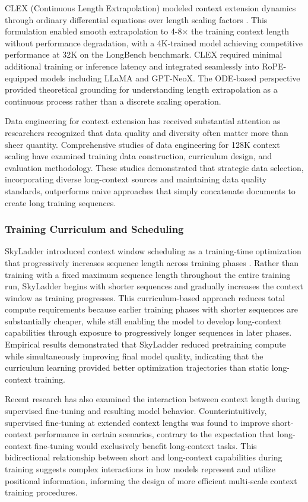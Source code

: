 CLEX (Continuous Length Extrapolation) modeled context extension dynamics through ordinary differential equations over length scaling factors \citep{chen2024clex}. This formulation enabled smooth extrapolation to 4-8$\times$ the training context length without performance degradation, with a 4K-trained model achieving competitive performance at 32K on the LongBench benchmark. CLEX required minimal additional training or inference latency and integrated seamlessly into RoPE-equipped models including LLaMA and GPT-NeoX. The ODE-based perspective provided theoretical grounding for understanding length extrapolation as a continuous process rather than a discrete scaling operation.

Data engineering for context extension has received substantial attention as researchers recognized that data quality and diversity often matter more than sheer quantity. Comprehensive studies of data engineering for 128K context scaling have examined training data construction, curriculum design, and evaluation methodology. These studies demonstrated that strategic data selection, incorporating diverse long-context sources and maintaining data quality standards, outperforms naive approaches that simply concatenate documents to create long training sequences.

\subsubsection{Training Curriculum and Scheduling}

SkyLadder introduced context window scheduling as a training-time optimization that progressively increases sequence length across training phases \citep{li2025skyladder}. Rather than training with a fixed maximum sequence length throughout the entire training run, SkyLadder begins with shorter sequences and gradually increases the context window as training progresses. This curriculum-based approach reduces total compute requirements because earlier training phases with shorter sequences are substantially cheaper, while still enabling the model to develop long-context capabilities through exposure to progressively longer sequences in later phases. Empirical results demonstrated that SkyLadder reduced pretraining compute while simultaneously improving final model quality, indicating that the curriculum learning provided better optimization trajectories than static long-context training.

Recent research has also examined the interaction between context length during supervised fine-tuning and resulting model behavior. Counterintuitively, supervised fine-tuning at extended context lengths was found to improve short-context performance in certain scenarios, contrary to the expectation that long-context fine-tuning would exclusively benefit long-context tasks. This bidirectional relationship between short and long-context capabilities during training suggests complex interactions in how models represent and utilize positional information, informing the design of more efficient multi-scale context training procedures.

